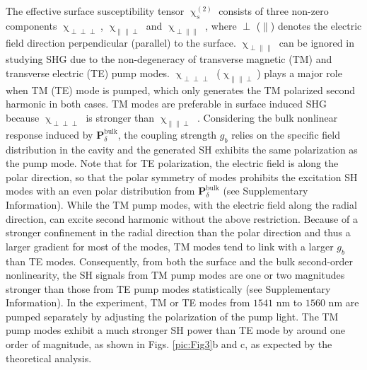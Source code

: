 \documentclass[a4paper,8pt,hyperref, twocolumn, aps, prl]{article}
\begin{document}
The effective surface susceptibility tensor $\upchi^{(2)}_s$ consists of three non-zero components $\upchi_{\perp \perp \perp}$, $\upchi_{\parallel \parallel \perp}$ and $\upchi_{\perp \parallel \parallel}$ \cite{heinz1991second}, where $\perp$ ($\parallel$) denotes the electric field direction perpendicular (parallel) to the surface.
$\upchi_{\perp \parallel \parallel}$ can be ignored in studying SHG due to the non-degeneracy of transverse magnetic (TM) and  transverse electric (TE) pump modes.
$\upchi_{\perp \perp \perp}$ ($\upchi_{\parallel \parallel \perp}$) plays a major role when TM (TE) mode is pumped, which only generates the TM polarized second harmonic in both cases.
TM modes are preferable in surface induced SHG because $\upchi_{\perp \perp \perp}$ is stronger than $\upchi_{\parallel \parallel \perp}$ \cite{rodriguez2008calibration}.
Considering the bulk nonlinear response induced by $\mathbf{P}^{\mathrm{bulk}}_\delta$, the coupling strength $g_b$ relies on the specific field distribution in the cavity and the generated SH exhibits the same polarization as the pump mode.
Note that for TE polarization, the  electric field is along the polar direction, so that the polar symmetry of modes prohibits the excitation SH modes with an even polar distribution from $\mathbf{P}^{\mathrm{bulk}}_\delta$ (see Supplementary Information).
While the TM pump modes, with the electric field along the radial direction, can excite second harmonic without the above restriction.
Because of a stronger confinement in the radial direction than the polar direction and thus a larger gradient for most of the modes, TM modes tend to link with a larger $g_b$ than TE modes.
Consequently, from both the surface and the bulk second-order nonlinearity, the SH signals from TM pump modes are one or two magnitudes stronger than those from TE pump modes statistically (see Supplementary Information).
In the experiment, TM or TE modes from $1541$ nm to $1560$ nm are pumped separately by adjusting the polarization of the pump light.
The TM pump modes exhibit a much stronger SH power than TE mode by around one order of magnitude, as shown in Figs. \ref{pic:Fig3}b and c, as expected by the theoretical analysis.
\end{document}
